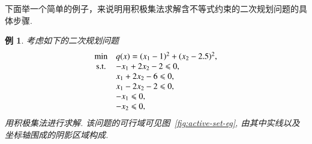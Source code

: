\documentclass{SBCbookchapter}
\newtheorem{thm}{定理}[section]
\newtheorem{exam}[thm]{例}
\numberwithin{equation}{section}
\begin{document}

下面举一个简单的例子，来说明用积极集法求解含不等式约束的二次规划问题的具体步骤.

\begin{exam}\label{eg:qp-active-set-algo}
考虑如下的二次规划问题
\begin{equation*}
\begin{array}{cl}
\min & q({x}) = (x_1 - 1)^2 + (x_2 - 2.5)^2, \\
{\rm s.t.} & -x_1 + 2x_2 - 2 \leqslant 0, \\
& x_1 + 2x_2 - 6 \leqslant 0, \\
& x_1 - 2x_2 - 2 \leqslant 0, \\
& -x_1 \leqslant 0, \\
& -x_2 \leqslant 0,
\end{array}
\end{equation*}
用积极集法进行求解. 该问题的可行域可见图~\ref{fig:active-set-eg}, 由其中实线以及坐标轴围成的阴影区域构成.


\newif\ifsteparrows
\steparrowsfalse


\end{exam}
\end{document}

